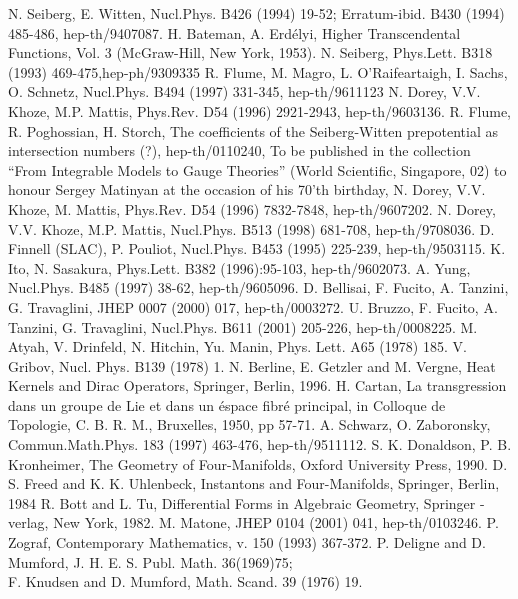 \documentclass[a4paper,12pt]{article}
\begin{document}
\begin{thebibliography}{99}
N. Seiberg, E. Witten, Nucl.Phys. B426 (1994) 19-52; 
Erratum-ibid. B430 (1994) 485-486, hep-th/9407087. 
H. Bateman, A. Erd\'{e}lyi, Higher Transcendental 
Functions, Vol. 3 (McGraw-Hill, New York, 1953).
N. Seiberg, Phys.Lett. B318 (1993) 469-475,hep-ph/9309335  
 R. Flume, M. Magro, L. O'Raifeartaigh, I. Sachs, O. Schnetz, 
Nucl.Phys. B494 (1997) 331-345, hep-th/9611123 
N. Dorey, V.V. Khoze, M.P. Mattis, 
Phys.Rev. D54 (1996) 2921-2943, hep-th/9603136.
R. Flume, R. Poghossian, H. Storch, The coefficients of 
the Seiberg-Witten prepotential as intersection numbers (?), hep-th/0110240, 
To be published in the collection ``From Integrable Models to Gauge 
Theories'' (World Scientific, Singapore, 02) to honour Sergey Matinyan at 
the occasion of his 70'th birthday,
N. Dorey, V.V. Khoze, M. Mattis, 
Phys.Rev. D54 (1996) 7832-7848, hep-th/9607202. 
N. Dorey, V.V. Khoze, M.P. Mattis, 
Nucl.Phys. B513 (1998) 681-708, hep-th/9708036.
D. Finnell (SLAC), P. Pouliot, Nucl.Phys. B453 (1995) 
225-239, 
hep-th/9503115. 
K. Ito, N. Sasakura, Phys.Lett. B382 (1996):95-103, 
hep-th/9602073.
 A. Yung, Nucl.Phys. B485 (1997) 38-62,  hep-th/9605096.
 D. Bellisai, F. Fucito, A. Tanzini, G. Travaglini, 
JHEP 0007 (2000) 017, hep-th/0003272.
 U. Bruzzo, F. Fucito, A. Tanzini, G. Travaglini, 
Nucl.Phys. B611 (2001) 205-226, hep-th/0008225.  
M. Atyah, V. Drinfeld, N. Hitchin, Yu. Manin, 
Phys. Lett. A65 (1978) 185. 
V. Gribov, Nucl. Phys. B139 (1978) 1.
N. Berline, E. Getzler and M. Vergne, 
Heat Kernels and Dirac Operators, Springer, Berlin, 1996. 
H. Cartan, La transgression dans un groupe de Lie 
et dans un \'{e}space fibr\'{e} principal, in Colloque de Topologie, 
C. B. R. M., Bruxelles, 1950, pp 57-71.
 A. Schwarz, O. Zaboronsky, 
Commun.Math.Phys. 183 (1997) 463-476, hep-th/9511112.
S. K. Donaldson, P. B. Kronheimer, The Geometry of 
Four-Manifolds, Oxford University Press, 1990.
D. S. Freed and K. K. Uhlenbeck, Instantons and 
Four-Manifolds, Springer, Berlin, 1984
R. Bott and L. Tu, Differential Forms in Algebraic 
Geometry, Springer - verlag, New York, 1982.
M. Matone, JHEP 0104 (2001) 041, hep-th/0103246. 
P. Zograf, Contemporary Mathematics, v. 150 (1993) 367-372. 
P. Deligne and D. Mumford, J. H. E. S. Publ. Math. 
36(1969)75; \\
F. Knudsen and D. Mumford, Math. Scand. 39 (1976) 19.  
\end{thebibliography}
\vfill\eject
  


  
\end{document}
